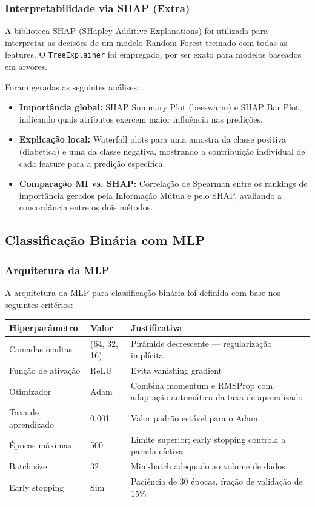 \documentclass[12pt]{article}
\begin{document}
\subsubsection{Interpretabilidade via SHAP (Extra)}

A biblioteca SHAP (SHapley Additive Explanations) foi utilizada para interpretar as decisões de um modelo Random Forest treinado com todas as features. O \texttt{TreeExplainer} foi empregado, por ser exato para modelos baseados em árvores.

Foram geradas as seguintes análises:

\begin{itemize}
\item \textbf{Importância global:} SHAP Summary Plot (beeswarm) e SHAP Bar Plot, indicando quais atributos exercem maior influência nas predições.
\item \textbf{Explicação local:} Waterfall plots para uma amostra da classe positiva (diabética) e uma da classe negativa, mostrando a contribuição individual de cada feature para a predição específica.
\item \textbf{Comparação MI vs. SHAP:} Correlação de Spearman entre os rankings de importância gerados pela Informação Mútua e pelo SHAP, avaliando a concordância entre os dois métodos.

\end{itemize}
\subsection{Classificação Binária com MLP}

\subsubsection{Arquitetura da MLP}

A arquitetura da MLP para classificação binária foi definida com base nos seguintes critérios:

\begin{table}[ht]
\centering
\begin{tabularx}{\textwidth}{|l|l|X|}
\hline
Hiperparâmetro & Valor & Justificativa \\
\hline
Camadas ocultas & (64, 32, 16) & Pirâmide decrescente --- regularização implícita \\
\hline
Função de ativação & ReLU & Evita vanishing gradient \\
\hline
Otimizador & Adam & Combina momentum e RMSProp com adaptação automática da taxa de aprendizado \\
\hline
Taxa de aprendizado & 0,001 & Valor padrão estável para o Adam \\
\hline
Épocas máximas & 500 & Limite superior; early stopping controla a parada efetiva \\
\hline
Batch size & 32 & Mini-batch adequado ao volume de dados \\
\hline
Early stopping & Sim & Paciência de 30 épocas, fração de validação de 15\% \\
\hline
\end{tabularx}
\end{table}
\end{document}
